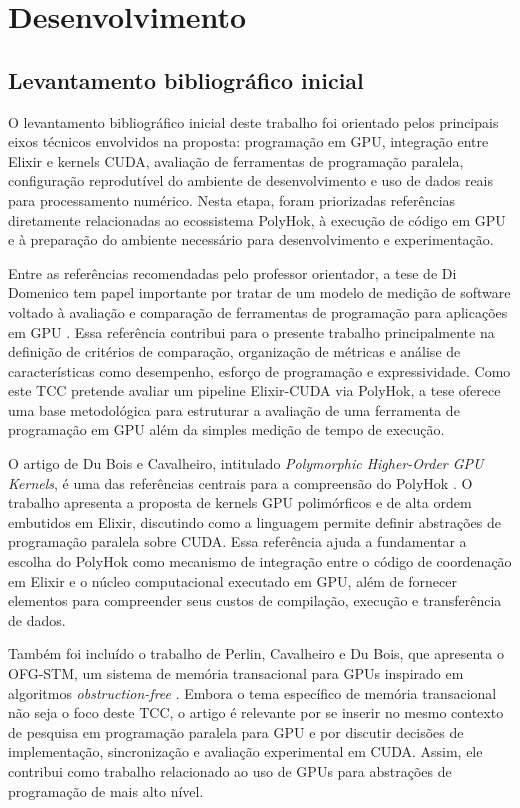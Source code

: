 \documentclass[tcc,capa]{texufpel}
\begin{document}
\chapter{Desenvolvimento}

\section{Levantamento bibliográfico inicial}

O levantamento bibliográfico inicial deste trabalho foi orientado pelos principais eixos técnicos envolvidos na proposta: programação em GPU, integração entre Elixir e kernels CUDA, avaliação de ferramentas de programação paralela, configuração reprodutível do ambiente de desenvolvimento e uso de dados reais para processamento numérico. Nesta etapa, foram priorizadas referências diretamente relacionadas ao ecossistema PolyHok, à execução de código em GPU e à preparação do ambiente necessário para desenvolvimento e experimentação.

Entre as referências recomendadas pelo professor orientador, a tese de Di Domenico tem papel importante por tratar de um modelo de medição de software voltado à avaliação e comparação de ferramentas de programação para aplicações em GPU \cite{diDomenico2022}. Essa referência contribui para o presente trabalho principalmente na definição de critérios de comparação, organização de métricas e análise de características como desempenho, esforço de programação e expressividade. Como este TCC pretende avaliar um pipeline Elixir-CUDA via PolyHok, a tese oferece uma base metodológica para estruturar a avaliação de uma ferramenta de programação em GPU além da simples medição de tempo de execução.

O artigo de Du Bois e Cavalheiro, intitulado \textit{Polymorphic Higher-Order GPU Kernels}, é uma das referências centrais para a compreensão do PolyHok \cite{duBoisCavalheiro2025}. O trabalho apresenta a proposta de kernels GPU polimórficos e de alta ordem embutidos em Elixir, discutindo como a linguagem permite definir abstrações de programação paralela sobre CUDA. Essa referência ajuda a fundamentar a escolha do PolyHok como mecanismo de integração entre o código de coordenação em Elixir e o núcleo computacional executado em GPU, além de fornecer elementos para compreender seus custos de compilação, execução e transferência de dados.

Também foi incluído o trabalho de Perlin, Cavalheiro e Du Bois, que apresenta o OFG-STM, um sistema de memória transacional para GPUs inspirado em algoritmos \textit{obstruction-free} \cite{perlinCavalheiroDuBois2024}. Embora o tema específico de memória transacional não seja o foco deste TCC, o artigo é relevante por se inserir no mesmo contexto de pesquisa em programação paralela para GPU e por discutir decisões de implementação, sincronização e avaliação experimental em CUDA. Assim, ele contribui como trabalho relacionado ao uso de GPUs para abstrações de programação de mais alto nível.
\end{document}
